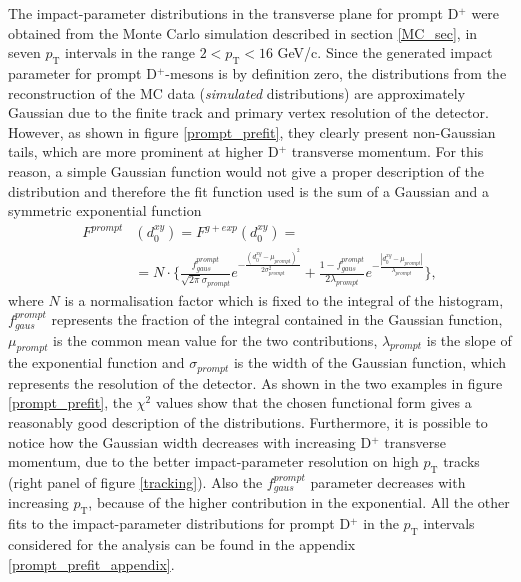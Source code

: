 \documentclass[b5paper,10pt,twoside,oldstyle,classica]{toptesi}
\newcommand{\pt}{p_\text{T}}
\begin{document}
The impact-parameter distributions in the transverse plane for prompt D$^+$ were obtained from the Monte Carlo simulation described in section \ref{MC_sec}, in seven $\pt$ intervals in the range $2<\pt<16$ GeV/c. Since the generated impact parameter for prompt D$^+$-mesons is by definition zero, the distributions from the reconstruction of the MC data (\textit{simulated} distributions) are approximately Gaussian due to the finite track and primary vertex resolution of the detector.  
However, as shown in figure \ref{prompt_prefit}, they clearly present non-Gaussian tails, which are more prominent at higher D$^+$ transverse momentum. For this reason, a simple Gaussian function would not give a proper description of the distribution and therefore the fit function used is the sum of a Gaussian and a symmetric exponential function
\begin{equation}
\begin{split}
F^{prompt}&(d_0^{xy}) = F^{g+exp}(d_0^{xy}) =\\
&=N\cdot \bigg\{\frac{f_{gaus}^{prompt}}{\sqrt{2\pi}\sigma_{prompt}}e^{-\frac{(d_0^{xy}-\mu_{prompt})^2}{2\sigma_{prompt}^2}}+\frac{1-f_{gaus}^{prompt}}{2\lambda_{prompt}}e^{-\frac{|d_0^{xy}-\mu_{prompt}|}{\lambda_{prompt}}}\bigg\},
\label{prompt_func}
\end{split}
\end{equation}
where $N$ is a normalisation factor which is fixed to the integral of the histogram, $f_{gaus}^{prompt}$ represents the fraction of the integral contained in the Gaussian function, $\mu_{prompt}$ is the common mean value for the two contributions, $\lambda_{prompt}$ is the slope of the exponential function and $\sigma_{prompt}$ is the width of the Gaussian function, which represents the resolution of the detector. As shown in the two examples in figure \ref{prompt_prefit}, the $\chi^2$ values show that the chosen functional form gives a reasonably good description of the distributions. Furthermore, it is possible to notice how the Gaussian width decreases with increasing D$^+$ transverse momentum, due to the better impact-parameter resolution on high $\pt$ tracks (right panel of figure \ref{tracking}). Also the $f_{gaus}^{prompt}$ parameter decreases with increasing $\pt$, because of the higher contribution in the exponential. All the other fits to the impact-parameter distributions for prompt D$^+$ in the $\pt$ intervals considered for the analysis can be found in the appendix \ref{prompt_prefit_appendix}.
\end{document}
